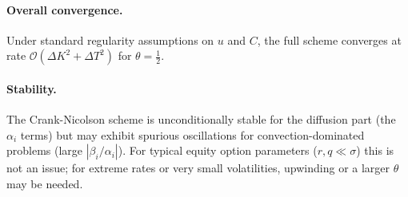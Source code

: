 \documentclass[11pt, a4paper]{article}
\newcommand{\dK}{\Delta K}
\newcommand{\dT}{\Delta T}
\theoremstyle{definition}
\theoremstyle{plain}
\begin{document}
\paragraph{Overall convergence.}
Under standard regularity assumptions on $u$ and $C$, the full
scheme converges at rate $\mathcal{O}(\dK^2 + \dT^2)$ for $\theta = \tfrac{1}{2}$.

\paragraph{Stability.}
The Crank-Nicolson scheme is unconditionally stable for the diffusion part
(the $\alpha_i$ terms) but may exhibit spurious oscillations for
convection-dominated problems (large $|\beta_i / \alpha_i|$). For typical
equity option parameters ($r, q \ll \sigma$) this is not an issue; for
extreme rates or very small volatilities, upwinding or a larger $\theta$ may
be needed.
\end{document}
